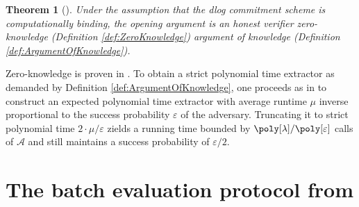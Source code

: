 \documentclass[10pt,article,oneside]{memoir}
\newtheorem{thm}{Theorem}[]
\theoremstyle{definition}
\theoremstyle{remark}
\DeclareMathOperator{\setup}{\mathsf{Setup}}
\DeclareMathOperator{\comm}{\mathsf{Com}}
\DeclareMathOperator{\open}{\mathsf{Open}}
\begin{document}


\begin{thm}[\cite{BootleGroth, Buenz}]
\label{thm:dlog}
Under the assumption that the dlog commitment scheme is computationally binding, the  opening argument
is an honest verifier zero-knowledge (Definition \ref{def:ZeroKnowledge}) argument of knowledge (Definition \ref{def:ArgumentOfKnowledge}).
\end{thm}

Zero-knowledge is proven in \cite{Buenz}.
To obtain a strict polynomial time extractor as demanded by Definition \ref{def:ArgumentOfKnowledge}, one proceeds as in \cite{BootleGroth} to construct an expected polynomial time extractor with average runtime $\mu$ inverse proportional to the success probability $\varepsilon$ of the adversary. 
Truncating it to strict polynomial time $2\cdot \mu/\varepsilon$ zields a running time bounded by $\poly[\lambda]/\poly[\varepsilon]$ calls of $\mathcal A$ and still maintains a success probability of $\varepsilon/2$.   


\section{The batch evaluation protocol from \cite{HaloInfinite}}
\label{s:MultiPointSinglePoint}
\end{document}

